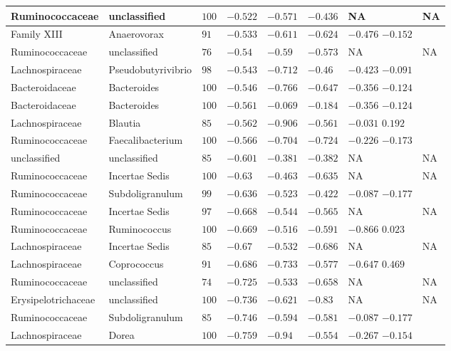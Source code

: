 \begin{table}[!ht]
\begin{tiny}
\begin{tabular}{|l|l|l|l|l|l|l|l|}
Ruminococcaceae & unclassified & $100$ & $-0.522$ & $-0.571$ & $-0.436$ & NA & NA \\ \hline
Family XIII & Anaerovorax & $91$ & $-0.533$ & $-0.611$ & $-0.624$ & $-0.476$ $-0.152$ & \\ \hline
Ruminococcaceae & unclassified & $76$ & $-0.54$ & $-0.59$ & $-0.573$ & NA & NA \\ \hline
Lachnospiraceae & Pseudobutyrivibrio & $98$ & $-0.543$ & $-0.712$ & $-0.46$ & $-0.423$ $-0.091$ & \\ \hline
Bacteroidaceae & Bacteroides & $100$ & $-0.546$ & $-0.766$ & $-0.647$ & $-0.356$ $-0.124$ & \\ \hline
Bacteroidaceae & Bacteroides & $100$ & $-0.561$ & $-0.069$ & $-0.184$ & $-0.356$ $-0.124$ & \\ \hline
Lachnospiraceae & Blautia & $85$ & $-0.562$ & $-0.906$ & $-0.561$ & $-0.031$ $0.192$ & \\ \hline
Ruminococcaceae & Faecalibacterium & $100$ & $-0.566$ & $-0.704$ & $-0.724$ & $-0.226$ $-0.173$ & \\ \hline
unclassified & unclassified & $85$ & $-0.601$ & $-0.381$ & $-0.382$ & NA & NA \\ \hline
Ruminococcaceae & Incertae Sedis & $100$ & $-0.63$ & $-0.463$ & $-0.635$ & NA & NA \\ \hline
Ruminococcaceae & Subdoligranulum & $99$ & $-0.636$ & $-0.523$ & $-0.422$ & $-0.087$ $-0.177$ & \\ \hline
Ruminococcaceae & Incertae Sedis & $97$ & $-0.668$ & $-0.544$ & $-0.565$ & NA & NA \\ \hline
Ruminococcaceae & Ruminococcus & $100$ & $-0.669$ & $-0.516$ & $-0.591$ & $-0.866$ $0.023$ & \\ \hline
Lachnospiraceae & Incertae Sedis & $85$ & $-0.67$ & $-0.532$ & $-0.686$ & NA & NA \\ \hline
Lachnospiraceae & Coprococcus & $91$ & $-0.686$ & $-0.733$ & $-0.577$ & $-0.647$ $0.469$ & \\ \hline
Ruminococcaceae & unclassified & $74$ & $-0.725$ & $-0.533$ & $-0.658$ & NA & NA \\ \hline
Erysipelotrichaceae & unclassified & $100$ & $-0.736$ & $-0.621$ & $-0.83$ & NA & NA \\ \hline
Ruminococcaceae & Subdoligranulum & $85$ & $-0.746$ & $-0.594$ & $-0.581$ & $-0.087$ $-0.177$ & \\ \hline
Lachnospiraceae & Dorea & $100$ & $-0.759$ & $-0.94$ & $-0.554$ & $-0.267$ $-0.154$ & \\ \hline

\end{tabular}
\end{tiny}
\end{table}
